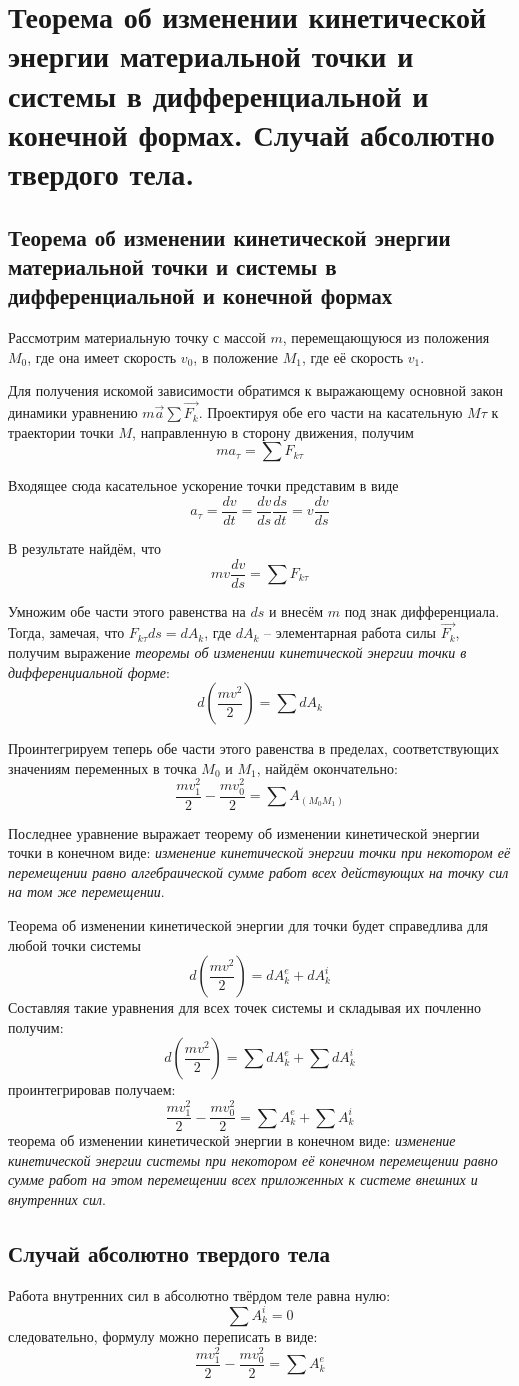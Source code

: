 \chapter{Теорема об изменении кинетической энергии материальной точки и системы
в дифференциальной и конечной формах. Случай абсолютно твердого тела.}

\section{Теорема об изменении кинетической энергии материальной точки и системы
в дифференциальной и конечной формах}

Рассмотрим материальную точку с массой \( m \), перемещающуюся из положения \( M_0 \), 
где она имеет скорость \( v_0 \), в положение \( M_1 \), где её скорость \( v_1 \).

Для получения искомой зависимости обратимся к выражающему основной закон динамики 
уравнению \( m\vec{a} \sum\vec{F_k} \). Проектируя обе его части на касательную 
\( M\tau \) к траектории точки \( M \), направленную в сторону движения, получим
\[ ma_\tau = \sum F_{k\tau} \]

Входящее сюда касательное ускорение точки представим в виде
\[ a_\tau = \frac{dv}{dt} = \frac{dv}{ds}\frac{ds}{dt} = v\frac{dv}{ds} \]

В результате найдём, что
\[ mv\frac{dv}{ds} = \sum F_{k\tau} \]

Умножим обе части этого равенства на \( ds \) и внесём \( m \) под знак 
дифференциала. Тогда, замечая, что \( F_{k\tau}ds = dA_k \), где 
\( dA_k \) -- элементарная работа силы \( \vec{F_k} \), получим выражение 
\emph{теоремы об изменении кинетической энергии точки в дифференциальной 
форме}:
\[ d\left( \frac{mv^2}{2} \right) = \sum dA_k \]

Проинтегрируем теперь обе части этого равенства в пределах, соответствующих 
значениям переменных в точка \( M_0 \) и \( M_1 \), найдём окончательно:
\[ \frac{mv^2_1}{2} - \frac{mv^2_0}{2} = \sum A_{(M_0 M_1)} \]

Последнее уравнение выражает теорему об изменении кинетической 
энергии точки в конечном виде: \emph{изменение кинетической энергии точки при 
некотором её перемещении равно алгебраической сумме работ всех действующих 
на точку сил на том же перемещении}.

Теорема об изменении кинетической энергии для точки будет справедлива 
для любой точки системы
\[ d\left( \frac{mv^2}{2} \right) = dA^e_k + dA^i_k \]
Составляя такие уравнения для всех точек системы и складывая их 
почленно получим:
\[ d\left( \frac{mv^2}{2} \right) = \sum dA^e_k + \sum dA^i_k \]
проинтегрировав получаем:
\[ 
	\frac{mv^2_1}{2} - \frac{mv^2_0}{2} = 
	\sum A^e_k + \sum A^i_k 
\]
теорема об изменении кинетической энергии в конечном виде: 
\emph{изменение кинетической энергии системы при некотором её 
конечном перемещении равно сумме работ на этом перемещении всех 
приложенных к системе внешних и внутренних сил}.

\section{Случай абсолютно твердого тела}

Работа внутренних сил в абсолютно твёрдом теле равна нулю:
\[ \sum A^i_k = 0\]
следовательно, формулу можно переписать в виде:
\[ \frac{mv^2_1}{2} - \frac{mv^2_0}{2} = \sum A^e_k \] 

\newpage
